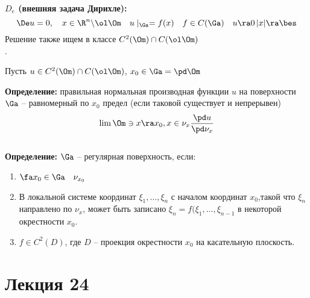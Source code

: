 \documentclass[a4paper,draft]{article}
\begin{document}
\noindent \textbf{$D_e$ (внешняя задача Дирихле):}\\
$$
\De u=0,\quad x\in \R^n\backslash\ol\Om\quad
u\mid_{\Ga}=f(x) \quad f\in C(\Ga)\quad u\ra 0\,
|x|\ra \bes
$$
Решение также ищем в классе $C^2(\Om)\cap C(\ol
\Om)$\\.

Пусть $u \in C^2(\Om)\cap C(\ol \Om)$,
$x_0\in\Ga=\pd\Om$

\textbf{Определение:} правильная нормальная производная функции
$u$ на поверхности $\Ga$ -- равномерный по $x_0$ предел (если
таковой существует и непрерывен)
$$
\lim{\Om\ni x\ra x_0,x\in \nu_x} \frac{\pd
u}{\pd \nu_x}
$$\\

\textbf{Определение:} $\Ga$ -- регулярная поверхность, если:
\begin{enumerate}
\item $\fa x_0\in\Ga \quad \nu_{x_0}$
\item В локальной системе координат $\xi_1,\ldots,\xi_n$ с началом
координат $x_0$,такой что  $\xi_n$ направлено по $\nu_x$, может
быть записано $\xi_n=f(\xi_1,\ldots,\xi_{n-1}$ в некоторой
окрестности $x_0$.
\item $f\in C^2(D)$, где $D$ -- проекция окрестности $x_0$ на
касательную плоскость.
\end{enumerate}











\section{Лекция 24}
\end{document}
